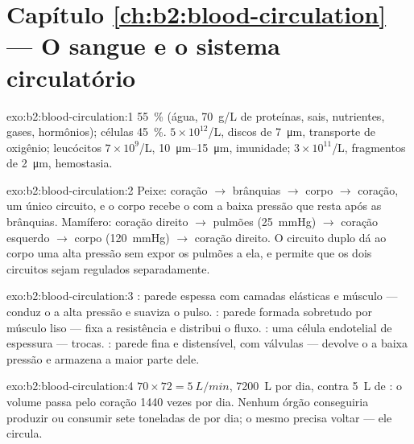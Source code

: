 \section*{Capítulo \ref{ch:b2:blood-circulation} --- O sangue e o sistema circulatório}

\begin{solution}{exo:b2:blood-circulation:1}
 \qty{55}{\%} (água, \qty{70}{g/L} de proteínas, sais,
nutrientes, gases, hormônios); células \qty{45}{\%}.  $5\times
10^{12}$/L, discos de \qty{7}{\micro m}, transporte de oxigênio;
leucócitos $7\times 10^{9}$/L, \qtyrange{10}{15}{\micro m}, imunidade;
 $3\times 10^{11}$/L, fragmentos de \qty{2}{\micro m},
hemostasia.
\end{solution}

\begin{solution}{exo:b2:blood-circulation:2}
Peixe: coração $\to$ brânquias $\to$ corpo $\to$ coração, um único
circuito, e o corpo recebe o  com a baixa pressão que resta após
as brânquias. Mamífero: coração direito $\to$ pulmões (\qty{25}{mmHg})
$\to$ coração esquerdo $\to$ corpo (\qty{120}{mmHg}) $\to$ coração
direito. O circuito duplo dá ao corpo uma alta pressão sem expor os
pulmões a ela, e permite que os dois circuitos sejam regulados
separadamente.
\end{solution}

\begin{solution}{exo:b2:blood-circulation:3}
: parede espessa com camadas elásticas e músculo --- conduz o
 a alta pressão e suaviza o pulso. : parede formada
sobretudo por músculo liso --- fixa a resistência e distribui o fluxo.
: uma célula endotelial de espessura --- trocas. : parede
fina e distensível, com válvulas --- devolve o  a baixa pressão e
armazena a maior parte dele.
\end{solution}

\begin{solution}{exo:b2:blood-circulation:4}
$70\times 72 = \qty{5}{L/min}$, \qty{7200}{L} por dia, contra
\qty{5}{L} de : o volume passa pelo coração \num{1440} vezes por
dia. Nenhum órgão conseguiria produzir ou consumir sete toneladas de
 por dia; o mesmo  precisa voltar --- ele circula.
\end{solution}

